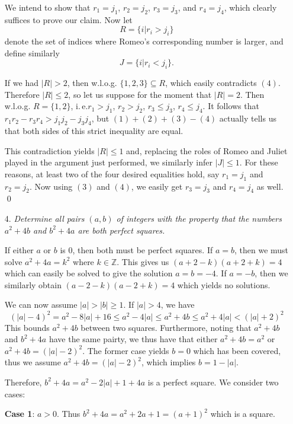 \documentclass[a4paper, 12pt]{article}
\def\ie{i.\,e.}
\def\ie{i.\,e.}	%
\begin{document}
\begin{enumerate}
We intend to show that $r_1 = j_1$, $r_2 = j_2$, $r_3 = j_3$, and $r_4 = j_4$, which clearly suffices to prove our claim. Now let
\[
	R = \{ i | r_i > j_i \}
\]
denote the set of indices where Romeo's corresponding number is larger, and define similarly
\[
	J = \{ i | r_i < j_i \}.
\]

If we had $|R| > 2$, then w.l.o.g. $\{1, 2, 3\} \subseteq R$, which easily contradicts $(4)$. Therefore $|R| \leq 2$, so let us suppose for the moment that $|R| = 2$. Then w.l.o.g. $R = \{1, 2\}$, \ie $r_1 > j_1$, $r_2 > j_2$, $r_3 \leq j_3$, $r_4 \leq j_4$. It follows that $r_1 r_2 - r_3 r_4 > j_1 j_2 - j_3 j_4$, but $(1) + (2) + (3) - (4)$ actually tells us that both sides of this strict inequality are equal.

This contradiction yields $|R| \leq 1$ and, replacing the roles of Romeo and Juliet played in the argument just performed, we similarly infer $|J| \leq 1$. For these reasons, at least two of the four desired equalities hold, say $r_1 = j_1$ and $r_2 = j_2$. Now using $(3)$ and $(4)$, we easily get $r_3 = j_3$ and $r_4 = j_4$ as well.
\qed


\vspace{5mm}
\item[4.]  \textit{Determine all pairs $(a,b)$ of integers with the property that the numbers $a^2+4b$ and $b^2+4a$ are both perfect squares.}

If either $a$ or $b$ is 0, then both must be perfect squares. If $a = b$, then we must solve $a^2 + 4a = k^2$ where $k \in \mathbb{Z}$. This gives us $(a+2-k)(a+2+k) = 4$ which can easily be solved to give the solution $a = b = -4$. If $a = -b$, then we similarly obtain $(a-2-k)(a-2+k) = 4$ which yields no solutions.

We can now assume $|a| > |b| \geq 1$.  If $|a| > 4$, we have
\begin{equation*}
    (|a| - 4)^2 = a^2 - 8|a| + 16 \leq a^2 - 4|a| \leq a^2 + 4b \leq a^2 + 4|a| < (|a| + 2)^2
\end{equation*}
This bounds $a^2 + 4b$ between two squares. Furthermore, noting that $a^2 + 4b$ and $b^2 + 4a$ have the same pairty, we thus have that either $a^2 + 4b = a^2$ or $a^2 + 4b = (|a| - 2)^2$. The former case yields $b = 0$ which has been covered, thus we assume $a^2 + 4b = (|a| - 2)^2$, which implies $b = 1 - |a|$.

Therefore, $b^2 + 4a = a^2 - 2|a| + 1 + 4a$ is a perfect square. We consider two cases:

\textbf{Case 1}: $a > 0$. Thus $b^2 + 4a = a^2 + 2a + 1 = (a+1)^2$ which is a square.


\end{enumerate}
\end{document}
